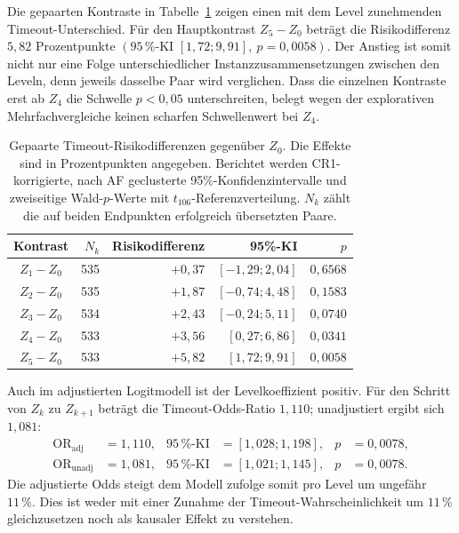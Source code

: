 Die gepaarten Kontraste in
Tabelle~\ref{tab:empirical-stable-z-timeout-rd} zeigen einen mit dem Level
zunehmenden Timeout-Unterschied. Für den Hauptkontrast \(Z_5-Z_0\) beträgt
die Risikodifferenz \(5{,}82\) Prozentpunkte
\((95\,\%\text{-KI }[1{,}72;9{,}91],\ p=0{,}0058)\). Der Anstieg ist somit
nicht nur eine Folge unterschiedlicher Instanzzusammensetzungen zwischen
den Leveln, denn jeweils dasselbe Paar wird verglichen. Dass die einzelnen
Kontraste erst ab \(Z_4\) die Schwelle \(p<0{,}05\) unterschreiten, belegt
wegen der explorativen Mehrfachvergleiche keinen scharfen Schwellenwert bei
\(Z_4\).

\begin{table}[H]
    \centering
    \caption[Gepaarte Timeout-Kontraste]{Gepaarte Timeout-Risikodifferenzen
    gegenüber \(Z_0\). Die Effekte sind in Prozentpunkten angegeben.
    Berichtet werden CR1-korrigierte, nach AF geclusterte
    95\%-Konfidenzintervalle und zweiseitige
    Wald-\(p\)-Werte mit \(t_{106}\)-Referenzverteilung. \(N_k\) zählt die
    auf beiden Endpunkten erfolgreich übersetzten Paare.}
    \label{tab:empirical-stable-z-timeout-rd}
    \begin{tabular}{crrrr}
        \toprule
        Kontrast & \(N_k\) & Risikodifferenz & 95\%-KI & \(p\) \\
        \midrule
        \(Z_1-Z_0\) & 535 & \(+0{,}37\) & \([-1{,}29;2{,}04]\) & \(0{,}6568\) \\
        \(Z_2-Z_0\) & 535 & \(+1{,}87\) & \([-0{,}74;4{,}48]\) & \(0{,}1583\) \\
        \(Z_3-Z_0\) & 534 & \(+2{,}43\) & \([-0{,}24;5{,}11]\) & \(0{,}0740\) \\
        \(Z_4-Z_0\) & 533 & \(+3{,}56\) & \([0{,}27;6{,}86]\)  & \(0{,}0341\) \\
        \(Z_5-Z_0\) & 533 & \(+5{,}82\) & \([1{,}72;9{,}91]\)  & \(0{,}0058\) \\
        \bottomrule
    \end{tabular}
\end{table}

Auch im adjustierten Logitmodell ist der Levelkoeffizient positiv. Für den
Schritt von \(Z_k\) zu \(Z_{k+1}\) beträgt die Timeout-Odds-Ratio
\(1{,}110\); unadjustiert ergibt sich \(1{,}081\):
\begin{align*}
    \mathrm{OR}_{\mathrm{adj}}
        &=1{,}110,
        &95\,\%\text{-KI}&=[1{,}028;1{,}198],
        &p&=0{,}0078,\\
    \mathrm{OR}_{\mathrm{unadj}}
        &=1{,}081,
        &95\,\%\text{-KI}&=[1{,}021;1{,}145],
        &p&=0{,}0078.
\end{align*}
Die adjustierte Odds steigt dem Modell zufolge somit pro Level um ungefähr
\(11\,\%\). Dies ist weder mit einer Zunahme der Timeout-Wahrscheinlichkeit
um \(11\,\%\) gleichzusetzen noch als kausaler Effekt zu verstehen.


